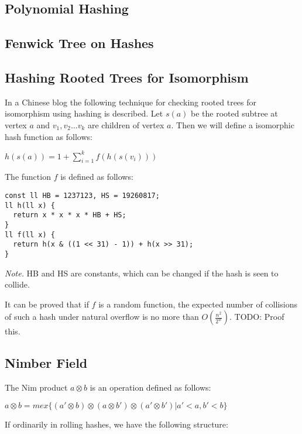 \subsection{Polynomial Hashing}
\subsection{Fenwick Tree on Hashes}
\subsection{Hashing Rooted Trees for Isomorphism}

In a Chinese blog \cite{TreeHash} the following technique for checking rooted trees for isomorphism using hashing is described.
Let $s(a)$ be the rooted subtree at vertex $a$ and $v_1, v_2 \dots v_k$ are children of vertex $a$.
Then we will define a isomorphic hash function as follows:

\begin{center}
  $\displaystyle h(s(a)) = 1 + \sum_{i=1}^{k} f(h(s(v_i)))$
\end{center}

The function $f$ is defined as follows:

\begin{lstlisting}
const ll HB = 1237123, HS = 19260817;
ll h(ll x) {
  return x * x * x * HB + HS;
}
ll f(ll x) {
  return h(x & ((1 << 31) - 1)) + h(x >> 31);
}
\end{lstlisting}

\textit{Note.} HB and HS are constants, which can be changed if the hash is seen to collide.

It can be proved that if $f$ is a random function,
the expected number of collisions of such a hash under natural overflow is no more than
$O(\frac{n^2}{2^w})$. TODO: Proof this.

\newpage

\subsection{Nimber Field}

The Nim product $a \otimes b$ is an operation defined as follows:

\begin{center}
$a \otimes b = mex\{(a\prime \otimes b) \otimes (a \otimes b\prime) \otimes (a\prime \otimes b\prime) | a\prime < a, b\prime < b\}$
\end{center}

If ordinarily in rolling hashes, we have the following structure:

